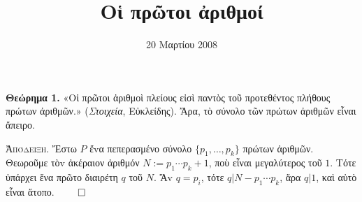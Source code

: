 \documentclass{article}
\title{Οἱ πρῶτοι ἀριθμοί}
\date{20 Μαρτίου 2008}
\begin{document}
\maketitle

\textbf{Θεώρημα 1.} «Οἱ πρῶτοι ἀριθμοὶ πλείους εἰσὶ παντὸς τοῦ προτεθέντος
πλήθους πρώτων ἀριθμῶν.» (\emph{Στοιχεία}, Εὐκλείδης). Ἄρα, τὸ σύνολο τῶν
πρώτων ἀριθμῶν εἶναι ἄπειρο.

\textsc{Ἀπόδειξη. } Ἔστω $P$ ἕvα πεπερασμένο σύνολο $\{p_1, \dots, p_k\}$
πρώτων ἀριθμῶν. Θεωροῦμε τὸv ἀκέραιον ἀριθμόν $N := p_1\cdots p_k + 1$, ποὺ
εἶναι μεγαλύτερος τοῦ $1$. Τότε ὑπάρχει ἕνα πρῶτο διαιρέτη $q$ τοῦ $N$.
Ἄv $q = p_i$, τότε $q | N - p_1\cdots p_k$, ἄρα $q | 1$, καὶ αὑτὸ εἶναι
ἄτοπο. $\qed$
\end{document}
